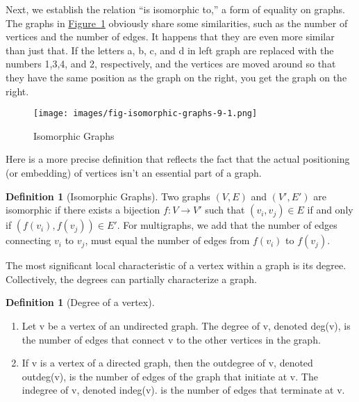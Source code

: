 \documentclass[10pt,]{book}
\theoremstyle{plain}
\theoremstyle{definition}
\newtheorem{definition}[theorem]{Definition}
\theoremstyle{definition}
\theoremstyle{definition}
\theoremstyle{definition}
\theoremstyle{definition}
\numberwithin{equation}{section}
\begin{document}
\par
Next, we establish the relation ``is isomorphic to,'' a form of equality on graphs. The graphs in \hyperref[fig-isomorphic-graphs-9-1]{Figure~\ref{fig-isomorphic-graphs-9-1}} obviously share some similarities, such as the number of vertices and the number of edges. It happens that they are even more similar than just that. If the letters a, b, c, and d in left graph are replaced with the numbers 1,3,4, and 2, respectively, and the vertices are moved around so that they have the same position as the graph on the right, you get the graph on the right.%
\leavevmode%
\begin{figure}
\centering
\texttt{[image: images/fig-isomorphic-graphs-9-1.png]}
\caption{Isomorphic Graphs
                \label{fig-isomorphic-graphs-9-1}}
\end{figure}
\par
Here is a more precise definition that reflects the fact that the actual positioning (or embedding) of vertices isn't an essential part of a graph.%
\begin{definition}[Isomorphic Graphs]\label{def-isomorphic-graphs.}
Two graphs \((V, E)\) and \((V', E')\) are isomorphic if there exists a bijection \(f:V\to V'\) such that \(\left(v_i,v_j\right)\in
E\) if and only if \(\left(f\left(v_i\right),f\left(v_j\right)\right)\in E'\). For multigraphs, we add that the number of edges connecting \(v_i\)
to \(v_j\), must equal the number of edges from \(f\left(v_i\right)\) to \(f\left(v_j\right)\).%
\end{definition}
\par
The most significant local characteristic of a vertex within a graph is its degree.
 Collectively, the degrees can partially characterize a graph.%
\begin{definition}[Degree of a vertex]\label{def-degree-of-a-vertex}
\label{notation-3}
\leavevmode%
\begin{enumerate}[label=\alph*]
\item\hypertarget{li-4}{} Let v be a vertex of an undirected graph. The degree of v, denoted \textup{ deg}(v), is the number of edges that connect v to the other vertices in the graph.%
\item\hypertarget{li-5}{} If v is a vertex of a directed graph, then the outdegree of v, denoted \textup{ outdeg}(v), is the number of edges of the graph that initiate
at v. The indegree of v, denoted \textup{ indeg}(v). is the number of edges that terminate at v.%
\end{enumerate}
%
\end{definition}
\end{document}
